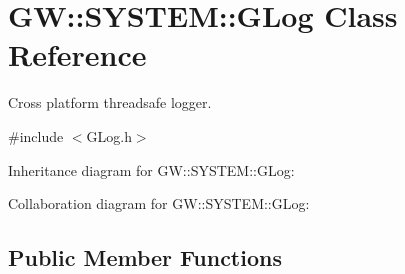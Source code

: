 \hypertarget{classGW_1_1SYSTEM_1_1GLog}{}\section{GW\+::S\+Y\+S\+T\+EM\+::G\+Log Class Reference}
\label{classGW_1_1SYSTEM_1_1GLog}


Cross platform threadsafe logger.  




{\ttfamily \#include $<$G\+Log.\+h$>$}



Inheritance diagram for GW\+::S\+Y\+S\+T\+EM\+::G\+Log\+:


Collaboration diagram for GW\+::S\+Y\+S\+T\+EM\+::G\+Log\+:
\subsection*{Public Member Functions}
